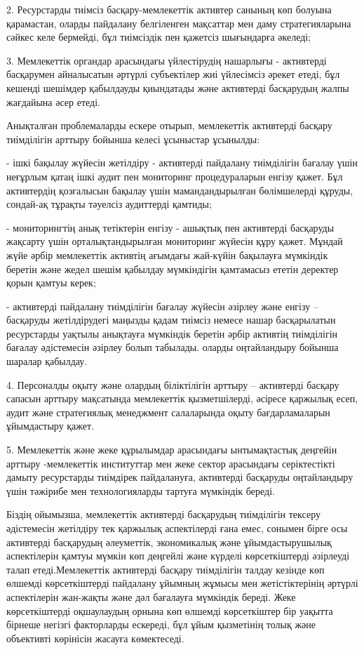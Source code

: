 \begin{multicols}{2}
2. Ресурстарды тиімсіз басқару-мемлекеттік активтер санының көп болуына
қарамастан, оларды пайдалану белгіленген мақсаттар мен даму
стратегияларына сәйкес келе бермейді, бұл тиімсіздік пен қажетсіз
шығындарға әкеледі;

3. Мемлекеттік органдар арасындағы үйлестірудің нашарлығы - активтерді
басқарумен айналысатын әртүрлі субъектілер жиі үйлесімсіз әрекет етеді,
бұл кешенді шешімдер қабылдауды қиындатады және активтерді басқарудың
жалпы жағдайына әсер етеді.

Анықталған проблемаларды ескере отырып, мемлекеттік активтерді басқару
тиімділігін арттыру бойынша келесі ұсыныстар ұсынылды:

- ішкі бақылау жүйесін жетілдіру - активтерді пайдалану тиімділігін
бағалау үшін неғұрлым қатаң ішкі аудит пен мониторинг процедураларын
енгізу қажет. Бұл активтердің қозғалысын бақылау үшін мамандандырылған
бөлімшелерді құруды, сондай-ақ тұрақты тәуелсіз аудиттерді қамтиды;

- мониторингтің анық тетіктерін енгізу - ашықтық пен активтерді
басқаруды жақсарту үшін орталықтандырылған мониторинг жүйесін құру
қажет. Мұндай жүйе әрбір мемлекеттік активтің ағымдағы жай-күйін
бақылауға мүмкіндік беретін және жедел шешім қабылдау мүмкіндігін
қамтамасыз ететін деректер қорын қамтуы керек;

- активтерді пайдалану тиімділігін бағалау жүйесін әзірлеу және енгізу
-- басқаруды жетілдірудегі маңызды қадам тиімсіз немесе нашар
басқарылатын ресурстарды уақтылы анықтауға мүмкіндік беретін әрбір
активтің тиімділігін бағалау әдістемесін әзірлеу болып табылады. оларды
оңтайландыру бойынша шаралар қабылдау.

4. Персоналды оқыту және олардың біліктілігін арттыру -- активтерді
басқару сапасын арттыру мақсатында мемлекеттік қызметшілерді, әсіресе
қаржылық есеп, аудит және стратегиялық менеджмент салаларында оқыту
бағдарламаларын ұйымдастыру қажет.

5. Мемлекеттік және жеке құрылымдар арасындағы ынтымақтастық деңгейін
арттыру -мемлекеттік институттар мен жеке сектор арасындағы
серіктестікті дамыту ресурстарды тиімдірек пайдалануға, активтерді
басқаруды оңтайландыру үшін тәжірибе мен технологияларды тартуға
мүмкіндік береді.

Біздің ойымызша, мемлекеттік активтерді басқарудың тиімділігін тексеру
әдістемесін жетілдіру тек қаржылық аспектілерді ғана емес, сонымен бірге
осы активтерді басқарудың әлеуметтік, экономикалық және ұйымдастырушылық
аспектілерін қамтуы мүмкін көп деңгейлі және күрделі көрсеткіштерді
әзірлеуді талап етеді.Мемлекеттік активтерді басқару тиімділігін талдау
кезінде көп өлшемді көрсеткіштерді пайдалану ұйымның жұмысы мен
жетістіктерінің әртүрлі аспектілерін жан-жақты және дәл бағалауға
мүмкіндік береді. Жеке көрсеткіштерді оқшаулаудың орнына көп өлшемді
көрсеткіштер бір уақытта бірнеше негізгі факторларды ескереді, бұл ұйым
қызметінің толық және объективті көрінісін жасауға көмектеседі.


\end{multicols}

